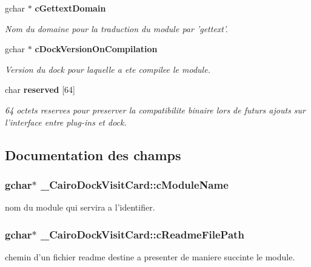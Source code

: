 \begin{CompactItemize}
gchar $\ast$ {\bf cGettextDomain}
\begin{CompactList}\small\item\em Nom du domaine pour la traduction du module par 'gettext'. \item\end{CompactList}\item 
gchar $\ast$ {\bf cDockVersionOnCompilation}
\begin{CompactList}\small\item\em Version du dock pour laquelle a ete compilee le module. \item\end{CompactList}\item 
char {\bf reserved} [64]
\begin{CompactList}\small\item\em 64 octets reserves pour preserver la compatibilite binaire lors de futurs ajouts sur l'interface entre plug-ins et dock. \item\end{CompactList}\end{CompactItemize}


\subsection{Documentation des champs}
\subsubsection{\setlength{\rightskip}{0pt plus 5cm}gchar$\ast$ {\bf \_\-CairoDockVisitCard::cModuleName}}\label{struct__CairoDockVisitCard_977fd14b591a762065c6deba330a2aea}


nom du module qui servira a l'identifier. 

\subsubsection{\setlength{\rightskip}{0pt plus 5cm}gchar$\ast$ {\bf \_\-CairoDockVisitCard::cReadmeFilePath}}\label{struct__CairoDockVisitCard_259449090259b643ae3304a9195892e3}


chemin d'un fichier readme destine a presenter de maniere succinte le module. 

